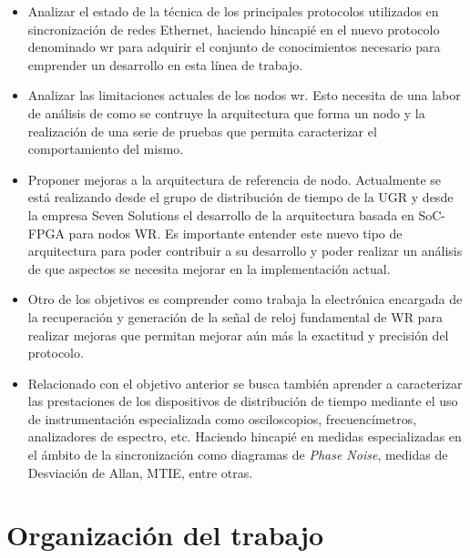\begin{itemize}
	\item Analizar el estado de la técnica de los principales protocolos 
	utilizados en sincronización de redes Ethernet, haciendo hincapié en el 
	nuevo protocolo denominado \gls{wr} para adquirir el conjunto de 
	conocimientos necesario para emprender un desarrollo en esta línea de 
	trabajo.
	
	\item Analizar las limitaciones actuales de los nodos \gls{wr}. Esto 
	necesita de una labor de análisis de como se contruye la arquitectura que 
	forma un nodo y la realización de una serie de pruebas que permita 
	caracterizar el comportamiento del mismo.
	
	\item Proponer mejoras a la arquitectura de referencia de nodo. Actualmente 
	se está realizando desde el grupo de distribución de tiempo de la UGR y 
	desde la empresa Seven Solutions el desarrollo de la arquitectura basada en 
	SoC-FPGA para nodos WR. Es importante entender este nuevo tipo de 
	arquitectura para poder contribuir a su desarrollo y poder realizar un 
	análisis de que aspectos se necesita mejorar en la implementación actual.
	
	\item Otro de los objetivos es comprender como trabaja la electrónica 
	encargada de la recuperación y generación de la señal de reloj fundamental 
	de WR para realizar mejoras que permitan mejorar aún más la exactitud y 
	precisión del protocolo.
	
	\item Relacionado con el objetivo anterior se busca también aprender a 
	caracterizar las prestaciones de los dispositivos de distribución de tiempo 
	mediante el uso de instrumentación especializada como osciloscopios, 
	frecuencímetros, analizadores de espectro, etc. Haciendo hincapié en 
	medidas especializadas en el ámbito de la sincronización como diagramas de 
	\textit{Phase Noise}, medidas de Desviación de Allan, MTIE, entre otras.
\end{itemize}



\section{Organización del trabajo}

